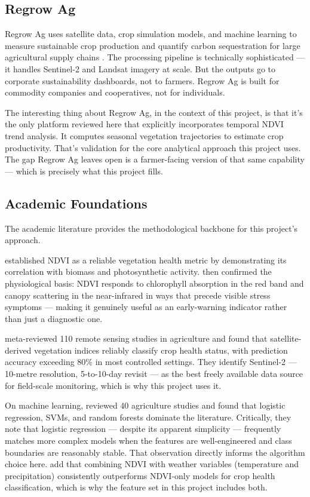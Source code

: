 \documentclass[12pt,a4paper]{report}
\begin{document}
\subsection{Regrow Ag}

Regrow Ag uses satellite data, crop simulation models, and machine learning to measure sustainable crop production and quantify carbon sequestration for large agricultural supply chains \citep{regrow2023}. The processing pipeline is technically sophisticated — it handles Sentinel-2 and Landsat imagery at scale. But the outputs go to corporate sustainability dashboards, not to farmers. Regrow Ag is built for commodity companies and cooperatives, not for individuals.

The interesting thing about Regrow Ag, in the context of this project, is that it's the only platform reviewed here that explicitly incorporates temporal NDVI trend analysis. It computes seasonal vegetation trajectories to estimate crop productivity. That's validation for the core analytical approach this project uses. The gap Regrow Ag leaves open is a farmer-facing version of that same capability — which is precisely what this project fills.

\subsection{Academic Foundations}

The academic literature provides the methodological backbone for this project's approach.

\citet{rouse1974} established NDVI as a reliable vegetation health metric by demonstrating its correlation with biomass and photosynthetic activity. \citet{tucker1979} then confirmed the physiological basis: NDVI responds to chlorophyll absorption in the red band and canopy scattering in the near-infrared in ways that precede visible stress symptoms — making it genuinely useful as an early-warning indicator rather than just a diagnostic one.

\citet{weiss2020} meta-reviewed 110 remote sensing studies in agriculture and found that satellite-derived vegetation indices reliably classify crop health status, with prediction accuracy exceeding 80\% in most controlled settings. They identify Sentinel-2 — 10-metre resolution, 5-to-10-day revisit — as the best freely available data source for field-scale monitoring, which is why this project uses it.

On machine learning, \citet{liakos2018} reviewed 40 agriculture studies and found that logistic regression, SVMs, and random forests dominate the literature. Critically, they note that logistic regression — despite its apparent simplicity — frequently matches more complex models when the features are well-engineered and class boundaries are reasonably stable. That observation directly informs the algorithm choice here. \citet{chlingaryan2018} add that combining NDVI with weather variables (temperature and precipitation) consistently outperforms NDVI-only models for crop health classification, which is why the feature set in this project includes both.
\end{document}
